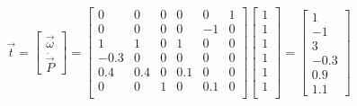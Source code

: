 \documentclass[conference]{IEEEtran}
\begin{document}
\begin{align*}
    \vec{t} = \begin{bmatrix}
                  \vec{\omega} \\
                  \dot{\vec{P}}
              \end{bmatrix} = \begin{bmatrix}
                                  0    & 0   & 0 & 0   & 0   & 1 \\
                                  0    & 0   & 0 & 0   & -1  & 0 \\
                                  1    & 1   & 0 & 1   & 0   & 0 \\
                                  -0.3 & 0   & 0 & 0   & 0   & 0 \\
                                  0.4  & 0.4 & 0 & 0.1 & 0   & 0 \\
                                  0    & 0   & 1 & 0   & 0.1 & 0 \\
                              \end{bmatrix} \begin{bmatrix}
                                                1 \\
                                                1 \\
                                                1 \\
                                                1 \\
                                                1 \\
                                                1 \\
                                            \end{bmatrix} = \begin{bmatrix}
                                                                1    \\
                                                                -1   \\
                                                                3    \\
                                                                -0.3 \\
                                                                0.9  \\
                                                                1.1
                                                            \end{bmatrix}
\end{align*}
\end{document}

